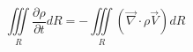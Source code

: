 
\begin{equation}
\iiint\limits_R \frac{\partial\rho}{\partial t} dR = -\iiint\limits_R ( \overrightarrow{\nabla}\cdot\rho\overrightarrow{V}) dR
\end{equation}
